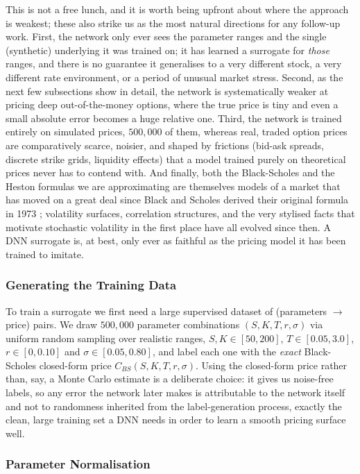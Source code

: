 \documentclass[a4paper,11pt, titlepage]{article}
\theoremstyle{definition}
\theoremstyle{plain}
\theoremstyle{remark}
\begin{document}
This is not a free lunch, and it is worth being upfront about where the approach is weakest; these also strike us as the most natural directions for any follow-up work. First, the network only ever sees the parameter ranges and the single (synthetic) underlying it was trained on; it has learned a surrogate for \emph{those} ranges, and there is no guarantee it generalises to a very different stock, a very different rate environment, or a period of unusual market stress. Second, as the next few subsections show in detail, the network is systematically weaker at pricing deep out-of-the-money options, where the true price is tiny and even a small absolute error becomes a huge relative one. Third, the network is trained entirely on simulated prices, $500{,}000$ of them, whereas real, traded option prices are comparatively scarce, noisier, and shaped by frictions (bid-ask spreads, discrete strike grids, liquidity effects) that a model trained purely on theoretical prices never has to contend with. And finally, both the Black-Scholes and the Heston formulas we are approximating are themselves models of a market that has moved on a great deal since Black and Scholes derived their original formula in 1973 \cite{black1973}; volatility surfaces, correlation structures, and the very stylised facts that motivate stochastic volatility in the first place have all evolved since then. A DNN surrogate is, at best, only ever as faithful as the pricing model it has been trained to imitate.

\subsubsection{Generating the Training Data}

To train a surrogate we first need a large supervised dataset of (parameters $\to$ price) pairs. We draw $500{,}000$ parameter combinations $(S, K, T, r, \sigma)$ via uniform random sampling over realistic ranges, $S, K \in [50, 200]$, $T \in [0.05, 3.0]$, $r \in [0, 0.10]$ and $\sigma \in [0.05, 0.80]$, and label each one with the \emph{exact} Black-Scholes closed-form price $C_{BS}(S, K, T, r, \sigma)$. Using the closed-form price rather than, say, a Monte Carlo estimate is a deliberate choice: it gives us noise-free labels, so any error the network later makes is attributable to the network itself and not to randomness inherited from the label-generation process, exactly the clean, large training set a DNN needs in order to learn a smooth pricing surface well.

\subsubsection{Parameter Normalisation}
\end{document}
